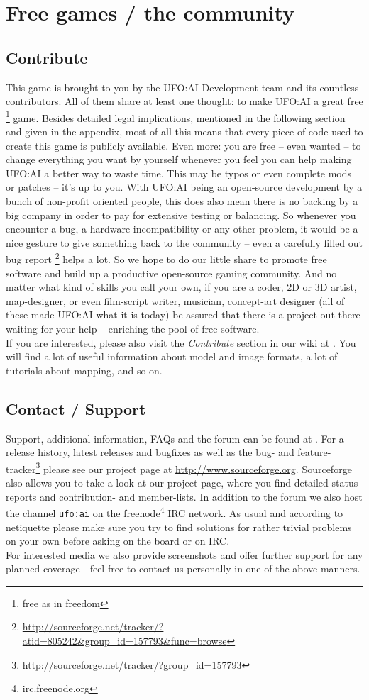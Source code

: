 \section{Free games / the community}
\subsection{Contribute}
This game is brought to you by the UFO:AI Development team and its countless contributors. All of them share at least one thought: to make UFO:AI a great free \footnote{free as in freedom} game. Besides detailed legal implications, mentioned in the following section and given in the appendix, most of all this means that every piece of code used to create this game is publicly available. Even more: you are free -- even wanted -- to change everything you want by yourself whenever you feel you can help making UFO:AI a better way to waste time. This may be typos or even complete mods or patches -- it's up to you. With UFO:AI being an open-source development by a bunch of non-profit oriented people, this does also mean there is no backing by a big company in order to pay for extensive testing or balancing. So whenever you encounter a bug, a hardware incompatibility or any other problem, it would be a nice gesture to give something back to the community -- even a carefully filled out bug report \footnote{\url{http://sourceforge.net/tracker/?atid=805242&group_id=157793&func=browse}} helps a lot. So we hope to do our little share to promote free software and build up a productive open-source gaming community. And no matter what kind of skills you call your own, if you are a coder, 2D or 3D artist, map-designer, or even film-script writer, musician, concept-art designer (all of these made UFO:AI what it is today) be assured that there is a project out there waiting for your help -- enriching the pool of free software.\\
If you are interested, please also visit the \textit{Contribute} section in our wiki at \ufohomepage. You will find a lot of useful information about model and image formats, a lot of tutorials about mapping, and so on.

\subsection{Contact / Support}
Support, additional information, FAQs and the forum can be found at \ufohomepage.
For a release history, latest releases and bugfixes as well as the bug- and feature-tracker\footnote{\url{http://sourceforge.net/tracker/?group_id=157793}} please see our project page at \url{http://www.sourceforge.org}. Sourceforge also allows you to take a look at our project page, where you find detailed status reports and contribution- and member-lists. In addition to the forum we also host the channel \texttt{ufo:ai} on the freenode\footnote{irc.freenode.org} IRC network. As usual and according to netiquette please make sure you try to find solutions for rather trivial problems on your own before asking on the board or on IRC.\\
For interested media we also provide screenshots and offer further support for any planned coverage - feel free to contact us personally in one of the above manners.

